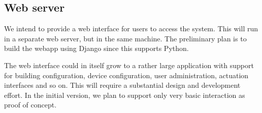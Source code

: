 \subsection{Web server}\label{subsection:webserver}
We intend to provide a web interface for users to access the system. This will run in a separate web server, but in the same machine. The preliminary plan is to build the webapp using Django since this supports Python. 

The web interface could in itself grow to a rather large application with support for building configuration, device configuration, user administration, actuation interfaces and so on. This will require a substantial design and development effort. In the initial version, we plan to support only very basic interaction as proof of concept.
